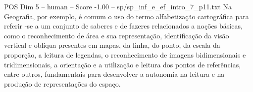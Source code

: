 \begin{textsample}{POS Dim 5 – human – Score -1.00 – sp/sp\_inf\_e\_ef\_intro\_7\_p11.txt}  \label{ex:f5_pos_007}
Na Geografia, por exemplo, é comum o uso do termo alfabetização cartográfica para referir -se a um conjunto de saberes e de fazeres relacionados a noções básicas, como o reconhecimento de área e sua representação, identificação da visão vertical e oblíqua presentes em mapas, da linha, do ponto, da escala da proporção, a leitura de legendas, o reconhecimento de imagens bidimensionais e tridimensionais, a orientação e a utilização e leitura dos pontos de referências, entre outros, fundamentais para desenvolver a autonomia na leitura e na produção de representações do espaço.

\end{textsample}
